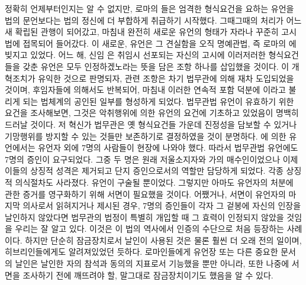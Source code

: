 정확히 언제부터인지는 알 수 없지만,
로마의 들은
엄격한 형식요건을 요하는 유언을
법의 문언보다는 법의 정신에 더 부합하게
취급하기 시작했다.
그때그때의 처리가 어느새 확립된 관행이 되어갔고,
마침내 완전히 새로운 유언의 형태가 자라나
꾸준히 고시법에 접목되어 들어갔다.
이 새로운,  유언은 그 견실함을
오직 명예관법, 즉 로마의 에
빚지고 있었다.
어느 해, 신임 은 취임시 선포되는 자신의 고시에
이러저러한 형식요건들을 갖춘 유언은 모두 인정하겠노라는 뜻을 담은
조항 하나를 삽입했을 것이다.
이 개혁조치가 유익한 것으로 판명되자, 관련 조항은
차기 법무관에 의해 재차 도입되었을 것이며,
후임자들에 의해서도 반복되어, 마침내
이러한 연속적 포함 덕분에 이라고 불리게 되는
법체계의 공인된 일부를 형성하게 되었다.
법무관법 유언이 유효하기 위한 요건을 조사해보면,
그것은 악취행위에 의한 유언의 요건에 기초하고 있었음이 명백히 드러날 것이다.
저 혁신가 법무관은 옛 형식요건들 가운데 진정성을 담보할 수 있거나
기망행위를 방지할 수 있는 것들만 보존하기로 결정하였을 것이 분명하다.
에 의한 유언에서는 유언자 외에 7명의 사람들이 현장에 나와야 했다.
따라서 법무관법 유언에도 7명의 증인이 요구되었다.
그중 두 명은 원래 저울소지자와
가의 매수인이었으나 이제 이들의 상징적 성격은
제거되고 단지 증인으로서의 역할만 담당하게 되었다.
각종 상징적 의식절차도 사라졌다.
유언이 구술될 뿐이었다. 그렇지만 아마도
유언자의 처분에 관한 증거를 영구화하기 위해 서면이 필요했을 것이다.
어쨌거나, 서면이 유언자의 마지막 의사로서 읽혀지거나 제시된 경우,
7명의 증인들이 각자 그 겉봉에 자신의 인장을 날인하지 않았다면
법무관의 법정이
특별히 개입할 때
그 효력이 인정되지 않았을 것임을 우리는 잘 알고 있다.
이것은
이
법의 역사에서
인증의 수단으로
처음 등장하는 사례이다.
하지만
단순히 잠금장치로서 날인이 사용된 것은 물론 훨씬 더 오래 전의 일이며,
히브리인들에게도 알려져있었던 듯하다.
로마인들에게 유언장 또는 다른 중요한 문서의 날인은
날인한 자의 참석과 동의의 지표로서 기능했을 뿐만 아니라,
또한
나중에 서면을 조사하기 전에 깨뜨려야 할, 말그대로 잠금장치이기도 했음을
알 수 있다.

